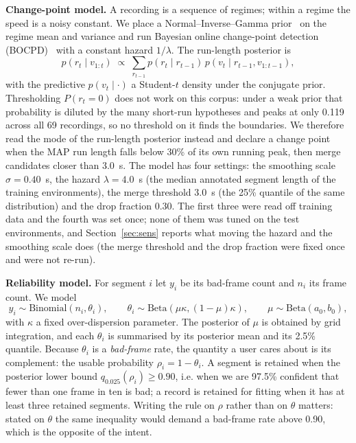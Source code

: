 \documentclass{swmcmthesis}
\begin{document}
\textbf{Change-point model.} A recording is a sequence of regimes; within a regime the speed is a noisy constant. We place a Normal--Inverse--Gamma prior~\cite{ref2} on the regime mean and variance and run Bayesian online change-point detection (BOCPD)~\cite{ref1} with a constant hazard $1/\lambda$. The run-length posterior is
\begin{equation}
p(r_t\mid v_{1:t}) \;\propto\; \sum_{r_{t-1}} p(r_t\mid r_{t-1})\,p(v_t\mid r_{t-1},v_{1:t-1}),
\end{equation}
with the predictive $p(v_t\mid\cdot)$ a Student-$t$ density under the conjugate prior. Thresholding $P(r_t=0)$ does not work on this corpus: under a weak prior that probability is diluted by the many short-run hypotheses and peaks at only 0.119 across all 69 recordings, so no threshold on it finds the boundaries. We therefore read the mode of the run-length posterior instead and declare a change point when the MAP run length falls below 30\% of its own running peak, then merge candidates closer than 3.0~s. The model has four settings: the smoothing scale $\sigma=0.40$~s, the hazard $\lambda=4.0$~s (the median annotated segment length of the training environments), the merge threshold $3.0$~s (the 25\% quantile of the same distribution) and the drop fraction $0.30$. The first three were read off training data and the fourth was set once; none of them was tuned on the test environments, and Section~\ref{sec:sens} reports what moving the hazard and the smoothing scale does (the merge threshold and the drop fraction were fixed once and were not re-run).

\textbf{Reliability model.} For segment $i$ let $y_i$ be its bad-frame count and $n_i$ its frame count. We model
\begin{equation}
y_i \sim \mathrm{Binomial}(n_i,\theta_i),\qquad
\theta_i \sim \mathrm{Beta}(\mu\kappa,(1-\mu)\kappa),\qquad
\mu \sim \mathrm{Beta}(a_0,b_0),
\end{equation}
with $\kappa$ a fixed over-dispersion parameter. The posterior of $\mu$ is obtained by grid integration, and each $\theta_i$ is summarised by its posterior mean and its 2.5\% quantile. Because $\theta_i$ is a \emph{bad-frame} rate, the quantity a user cares about is its complement: the usable probability $\rho_i=1-\theta_i$. A segment is retained when the posterior lower bound $q_{0.025}(\rho_i)\ge0.90$, i.e. when we are 97.5\% confident that fewer than one frame in ten is bad; a record is retained for fitting when it has at least three retained segments. Writing the rule on $\rho$ rather than on $\theta$ matters: stated on $\theta$ the same inequality would demand a bad-frame rate above 0.90, which is the opposite of the intent.
\end{document}
